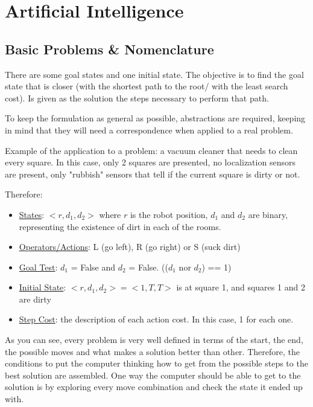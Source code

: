 
\section{Artificial Intelligence}
\subsection{Basic Problems \& Nomenclature}
There are some goal states and one initial state. The objective is to find the goal state that is closer (with the shortest path to the root/ with the least search cost). Is given as the solution the steps necessary to perform that path.

To keep the formulation as general as possible, abstractions are required, keeping in mind that they will need a correspondence when applied to a real problem.

Example of the application to a problem: a vacuum cleaner that needs to clean every square. In this case, only 2 squares are presented, no localization sensors are present, only "rubbish" sensors that tell if the current square is dirty or not.

Therefore:
\begin{itemize}
    \item \ul{States}: $<r, d_1, d_2>$ where $r$ is the robot position, $d_1$ and $d_2$ are binary, representing the existence of dirt in each of the rooms.
    \item \ul{Operators/Actions}: L (go left), R (go right) or S (suck dirt)
    \item \ul{Goal Test}: $d_1$ = False and $d_2$ = False. (($d_1$ nor $d_2$) == 1)
    \item \ul{Initial State}: $<r, d_1, d_2> = <1, T, T>$ is at square 1, and squares 1 and 2 are dirty
    \item \ul{Step Cost}: the description of each action cost. In this case, 1 for each one.
\end{itemize}








As you can see, every problem is very well defined in terms of the start, the end, the possible moves and what makes a solution better than other. Therefore, the conditions to put the computer thinking how to get from the possible steps to the best solution are assembled. One way the computer should be able to get to the solution is by exploring every move combination and check the state it ended up with.


